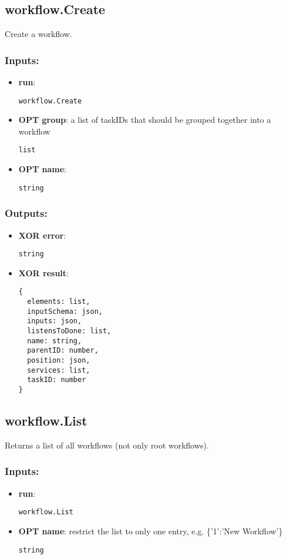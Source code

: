 \subsection{workflow.Create}
\label{ch:builtinservices:workflow.Create}
Create a workflow.
\subsubsection*{Inputs:}
\begin{itemize}
  \small
    \item \textbf{run}: 
\begin{lstlisting}
workflow.Create
\end{lstlisting}
    \item \textbf{OPT group}: a list of taskIDs that should be grouped together into a workflow
\begin{lstlisting}
list
\end{lstlisting}
    \item \textbf{OPT name}: 
\begin{lstlisting}
string
\end{lstlisting}
  \end{itemize}
\subsubsection*{Outputs:}
\begin{itemize}
  \small
    \item \textbf{XOR error}: 
\begin{lstlisting}
string
\end{lstlisting}
    \item \textbf{XOR result}: 
\begin{lstlisting}
{
  elements: list, 
  inputSchema: json, 
  inputs: json, 
  listensToDone: list, 
  name: string, 
  parentID: number, 
  position: json, 
  services: list, 
  taskID: number
}
\end{lstlisting}
  \end{itemize}

\subsection{workflow.List}
\label{ch:builtinservices:workflow.List}
Returns a list of all workflows (not only root workflows).
\subsubsection*{Inputs:}
\begin{itemize}
  \small
    \item \textbf{run}: 
\begin{lstlisting}
workflow.List
\end{lstlisting}
    \item \textbf{OPT name}: restrict the list to only one entry, e.g. \{'1':'New Workflow'\}
\begin{lstlisting}
string
\end{lstlisting}
  \end{itemize}
